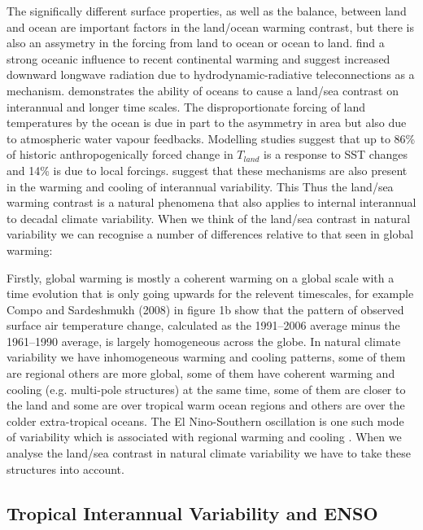 The significally different surface properties, as well as the balance, between 
land and ocean are important factors in the land/ocean warming contrast, but 
there is also an assymetry in the forcing from land to ocean or ocean to land.  
\citet{Compo2008} find a strong oceanic influence to recent continental warming 
and suggest increased downward longwave radiation due to hydrodynamic-radiative 
teleconnections as a mechanism.  \citet{Dommenget2009} demonstrates the ability 
of oceans to cause a land/sea contrast on interannual and longer time scales.  
The disproportionate forcing of land temperatures by the ocean is due in part to 
the asymmetry in area but also due to atmospheric water vapour feedbacks.  
Modelling studies suggest that up to 86\% of historic anthropogenically forced 
change in $T_{land}$ is a response to SST changes and 14\% is due to local 
forcings. \citet{Dommenget2009} suggest that these mechanisms are also present 
in the warming and cooling of interannual variability. This  Thus the land/sea 
warming contrast is a natural phenomena that also applies to internal 
interannual to decadal climate variability.  When we think of the land/sea 
contrast in natural variability we can recognise a number of differences 
relative to that seen in global warming: 

Firstly, global warming is mostly a coherent warming on a global scale with a 
time evolution that is only going upwards for the relevent timescales, for 
example Compo and Sardeshmukh (2008) in figure 1b show that the pattern of 
observed surface air temperature change, calculated as the 1991--2006 average 
minus the 1961--1990 average, is largely homogeneous across the globe. In 
natural climate variability we have inhomogeneous warming and cooling patterns, 
some of them are regional others are more global, some of them have coherent 
warming and cooling (e.g. multi-pole structures) at the same time, some of them 
are closer to the land and some are over tropical warm ocean regions and others 
are over the colder extra-tropical oceans. The El Nino-Southern oscillation is 
one such mode of variability which is associated with regional warming and 
cooling \citep{Halpert1992}. When we analyse the land/sea contrast in natural 
climate variability we have to take these structures into account.

\subsection{Tropical Interannual Variability and ENSO}

